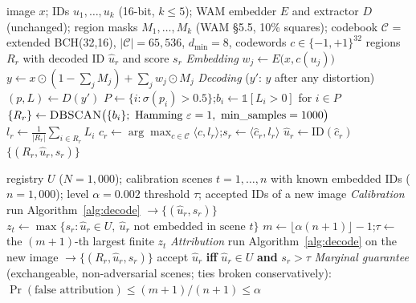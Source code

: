 \begin{algorithm}[t]
\caption{Codebook-constrained soft decoding for WAM multi-message watermarks}\label{alg:decode}
\begin{algorithmic}[1]
\Require image $x$; IDs $u_1,\dots,u_k$ (16-bit, $k\le 5$); WAM embedder $E$ and extractor $D$ (unchanged); region masks $M_1,\dots,M_k$ (WAM \S5.5, 10\% squares); codebook $\mathcal{C}$ = extended BCH(32,16), $|\mathcal{C}|=65{,}536$, $d_{\min}=8$, codewords $c\in\{-1,+1\}^{32}$
\Ensure regions $R_r$ with decoded ID $\hat u_r$ and score $s_r$
\Statex \textit{Embedding}
 \State $w_j \gets E\big(x, c(u_j)\big)$ \EndFor
\State $y \gets x\odot(1-\sum_j M_j) + \sum_j w_j\odot M_j$
\Statex \textit{Decoding} ($y'$: $y$ after any distortion)
\State $(p, L) \gets D(y')$ 
\State $P \gets \{i : \sigma(p_i) > 0.5\}$;\quad $b_i \gets \mathbb{1}[L_i>0]$ for $i\in P$
\State $\{R_r\} \gets \textsc{DBSCAN}\big(\{b_i\};\ \text{Hamming }\varepsilon=1,\ \text{min\_samples}=1000\big)$ 
  \State $l_r \gets \frac{1}{|R_r|}\sum_{i\in R_r} L_i$
  \State $\hat c_r \gets \arg\max_{c\in\mathcal{C}} \langle c, l_r\rangle$;\quad $s_r \gets \langle \hat c_r, l_r\rangle$ 
  \State $\hat u_r \gets \mathrm{ID}(\hat c_r)$
\EndFor
\State \Return $\{(R_r,\hat u_r,s_r)\}$
\end{algorithmic}
\end{algorithm}

\begin{algorithm}[t]
\caption{Calibrated registry attribution}\label{alg:attr}
\begin{algorithmic}[1]
\Require registry $U$ ($N=1{,}000$); calibration scenes $t=1,\dots,n$ with known embedded IDs ($n=1{,}000$); level $\alpha=0.002$
\Ensure threshold $\tau$; accepted IDs of a new image
\Statex \textit{Calibration}
  \State run Algorithm~\ref{alg:decode} $\to \{(\hat u_r, s_r)\}$
  \State $z_t \gets \max\{s_r : \hat u_r\in U,\ \hat u_r \text{ not embedded in scene } t\}$ 
\EndFor
\State $m \gets \lfloor \alpha(n+1)\rfloor - 1$;\quad $\tau \gets$ the $(m+1)$-th largest finite $z_t$ 
\Statex \textit{Attribution}
\State run Algorithm~\ref{alg:decode} on the new image $\to \{(R_r,\hat u_r, s_r)\}$
\State accept $\hat u_r$ \textbf{iff} $\hat u_r\in U$ \textbf{and} $s_r>\tau$
\Statex \textit{Marginal guarantee} (exchangeable, non-adversarial scenes; ties broken conservatively): $\Pr(\text{false attribution}) \le (m+1)/(n+1) \le \alpha$
\end{algorithmic}
\end{algorithm}
